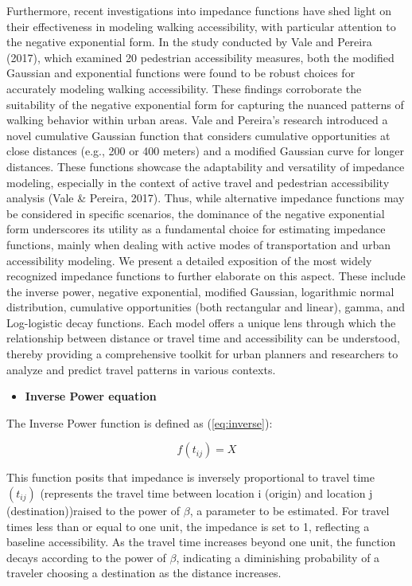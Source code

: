 \documentclass[
11pt, %
oneside, %
english, %
singlespacing, %
]{macthesis} %
\def\tightlist{}
\begin{document}
Furthermore, recent investigations into impedance functions have shed light on their effectiveness in modeling walking accessibility, with particular attention to the negative exponential form. In the study conducted by Vale and Pereira (2017), which examined 20 pedestrian accessibility measures, both the modified Gaussian and exponential functions were found to be robust choices for accurately modeling walking accessibility. These findings corroborate the suitability of the negative exponential form for capturing the nuanced patterns of walking behavior within urban areas. Vale and Pereira's research introduced a novel cumulative Gaussian function that considers cumulative opportunities at close distances (e.g., 200 or 400 meters) and a modified Gaussian curve for longer distances. These functions showcase the adaptability and versatility of impedance modeling, especially in the context of active travel and pedestrian accessibility analysis (Vale \& Pereira, 2017). Thus, while alternative impedance functions may be considered in specific scenarios, the dominance of the negative exponential form underscores its utility as a fundamental choice for estimating impedance functions, mainly when dealing with active modes of transportation and urban accessibility modeling. We present a detailed exposition of the most widely recognized impedance functions to further elaborate on this aspect. These include the inverse power, negative exponential, modified Gaussian, logarithmic normal distribution, cumulative opportunities (both rectangular and linear), gamma, and Log-logistic decay functions. Each model offers a unique lens through which the relationship between distance or travel time and accessibility can be understood, thereby providing a comprehensive toolkit for urban planners and researchers to analyze and predict travel patterns in various contexts.

\begin{itemize}
\tightlist
\item
  \textbf{Inverse Power equation}
\end{itemize}

The Inverse Power function is defined as (\ref{eq:inverse}):

\begin{equation}
f(t_{ij}) = X
\label{eq:inverse}
\end{equation}

This function posits that impedance is inversely proportional to travel time \((t_{ij})\) (represents the travel time between location i (origin) and location j (destination))raised to the power of \(\beta\), a parameter to be estimated. For travel times less than or equal to one unit, the impedance is set to 1, reflecting a baseline accessibility. As the travel time increases beyond one unit, the function decays according to the power of \(\beta\), indicating a diminishing probability of a traveler choosing a destination as the distance increases.
\end{document}
